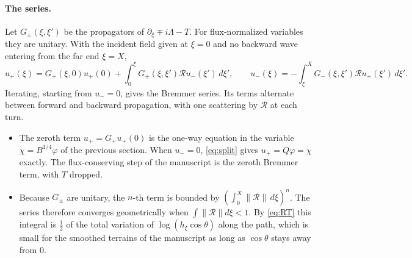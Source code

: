 \documentclass[11pt]{article}
\newcommand{\pd}{\partial}
\begin{document}
\paragraph{The series.} Let $G_\pm(\xi,\xi')$ be the propagators of
$\pd_\xi\mp i\Lambda-T$. For flux-normalized variables they are unitary. With
the incident field given at $\xi=0$ and no backward wave entering from the far
end $\xi=X$,
\[
u_+(\xi)=G_+(\xi,0)u_+(0)+\int_0^\xi G_+(\xi,\xi')\mathcal R u_-(\xi')\,d\xi',\qquad
u_-(\xi)=-\int_\xi^X G_-(\xi,\xi')\mathcal R u_+(\xi')\,d\xi'.
\]
Iterating, starting from $u_-=0$, gives the Bremmer series. Its terms alternate
between forward and backward propagation, with one scattering by $\mathcal R$ at
each turn.
\begin{itemize}
\item The zeroth term $u_+=G_+u_+(0)$ is the one-way equation in the variable
  $\chi=B^{1/4}\varphi$ of the previous section. When $u_-=0$,
  \eqref{eq:split} gives $u_+=Q\varphi=\chi$ exactly. The flux-conserving step
  of the manuscript is the zeroth Bremmer term, with $T$ dropped.
\item Because $G_\pm$ are unitary, the $n$-th term is bounded by
  $\left(\int_0^X\|\mathcal R\|\,d\xi\right)^n$. The series therefore converges
  geometrically when $\int\|\mathcal R\|d\xi<1$. By \eqref{eq:RT} this
  integral is $\tfrac12$ of the total variation of $\log(h_\xi\cos\theta)$
  along the path, which is small for the smoothed terrains of the manuscript
  as long as $\cos\theta$ stays away from $0$.
\end{itemize}
\end{document}
